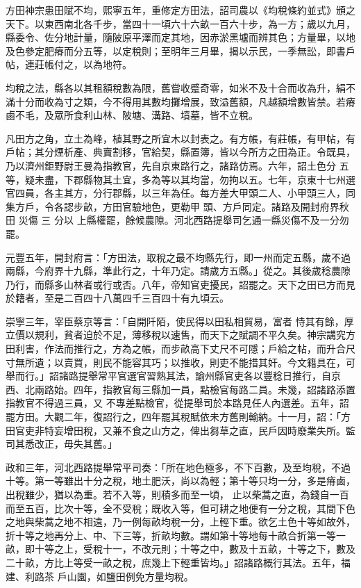 
\begin{pinyinscope}

 方田神宗患田賦不均，熙寧五年，重修定方田法，詔司農以《均稅條約並式》頒之天下。以東西南北各千步，當四十一頃六十六畝一百六十步，為一方；歲以九月，縣委令、佐分地計量，隨陂原平澤而定其地，因赤淤黑壚而辨其色；方量畢，以地及色參定肥瘠而分五等，以定稅則；至明年三月畢，揭以示民，一季無訟，即書戶帖，連莊帳付之，以為地符。



 均稅之法，縣各以其租額稅數為限，舊嘗收蹙奇零，如米不及十合而收為升，絹不滿十分而收為寸之類，今不得用其數均攤增展，致溢舊額，凡越額增數皆禁。若瘠鹵不毛，及眾所食利山林、陂塘、溝路、墳墓，皆不立稅。



 凡田方之角，立土為峰，植其野之所宜木以封表之。有方帳，有莊帳，有甲帖，有戶帖；其分煙析產、典賣割移，官給契，縣置簿，皆以今所方之田為正。令既具，乃以濟州鉅野尉王曼為指教官，先自京東路行之，諸路仿焉。六年，詔土色分
 五等，疑未盡，下郡縣物其土宜，多為等以其均當，勿拘以五。七年，京東十七州選官四員，各主其方，分行郡縣，以三年為任。每方差大甲頭二人、小甲頭三人，同集方戶，令各認步畝，方田官驗地色，更勒甲
 頭、方戶同定。諸路及開封府界秋田
 災傷
 三
 分以
 上縣權罷，餘候農隙。河北西路提舉司乞通一縣災傷不及一分勿罷。



 元豐五年，開封府言：「方田法，取稅之最不均縣先行，即一州而定五縣，歲不過兩縣，今府界十九縣，準此行之，十年乃定。請歲方五縣。」從之。其後歲稔農隙乃行，而縣多山林者或行或否。八年，帝知官吏擾民，詔罷之。天下之田已方而見於籍者，至是二百四十八萬四千三百四十有九頃云。



 崇寧三年，宰臣蔡京等言：「自開阡陌，使民得以田私相貿易，富者
 恃其有餘，厚立價以規利，貧者迫於不足，薄移稅以速售，而天下之賦調不平久矣。神宗講究方田利害，作法而推行之，方為之帳，而步畝高下丈尺不可隱；戶給之帖，而升合尺寸無所遺；以賣買，則民不能容其巧；以推收，則吏不能措其奸。今文籍具在，可舉而行。」詔諸路提舉常平官選官習熟其法，諭州縣官吏各以豐稔日推行，自京西、北兩路始。四年，指教官每三縣加一員，點檢官每路二員。未幾，詔諸路添置指教官不得過三員，又
 不專差點檢官，從提舉司於本路見任人內選差。五年，詔罷方田。大觀二年，復詔行之，四年罷其稅賦依未方舊則輸納。十一月，詔：「方田官吏非特妄增田稅，又兼不食之山方之，俾出芻草之直，民戶因時廢業失所。監司其悉改正，毋失其舊。」



 政和三年，河北西路提舉常平司奏：「所在地色極多，不下百數，及至均稅，不過十等。第一等雖出十分之稅，地土肥沃，尚以為輕；第十等只均一分，多是瘠鹵，出稅雖少，猶以為重。若不入等，則積多而至一頃，
 止以柴蒿之直，為錢自一百而至五百，比次十等，全不受稅；既收入等，但可耕之地便有一分之稅，其間下色之地與柴蒿之地不相遠，乃一例每畝均稅一分，上輕下重。欲乞土色十等如故外，折十等之地再分上、中、下三等，折畝均數。謂如第十等地每十畝合折第一等一畝，即十等之上，受稅十一，不改元則；十等之中，數及十五畝，十等之下，數及二十畝，方比上等受一畝之稅，庶幾上下輕重皆均。」詔諸路概行其法。五年，福建、利路茶
 戶山園，如鹽田例免方量均稅。




\end{pinyinscope}
